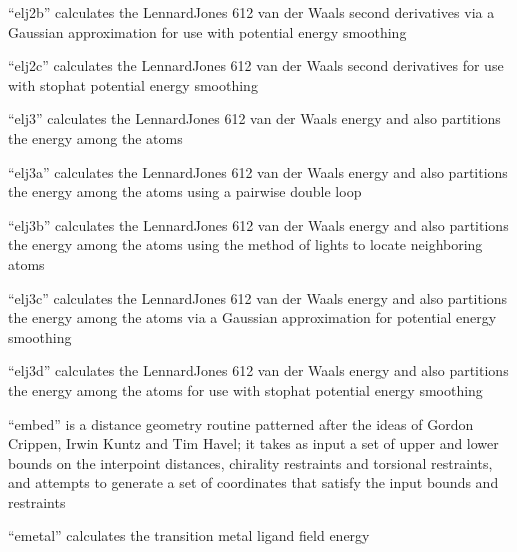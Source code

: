 \documentclass[letterpaper,11pt,english]{sphinxmanual}
\begin{document}

“elj2b” calculates the Lennard\sphinxhyphen{}Jones 6\sphinxhyphen{}12 van der Waals second derivatives via a Gaussian approximation for use with potential energy smoothing


“elj2c” calculates the Lennard\sphinxhyphen{}Jones 6\sphinxhyphen{}12 van der Waals second derivatives for use with stophat potential energy smoothing


“elj3” calculates the Lennard\sphinxhyphen{}Jones 6\sphinxhyphen{}12 van der Waals energy and also partitions the energy among the atoms


“elj3a” calculates the Lennard\sphinxhyphen{}Jones 6\sphinxhyphen{}12 van der Waals energy and also partitions the energy among the atoms using a pairwise double loop


“elj3b” calculates the Lennard\sphinxhyphen{}Jones 6\sphinxhyphen{}12 van der Waals energy and also partitions the energy among the atoms using the method of lights to locate neighboring atoms


“elj3c” calculates the Lennard\sphinxhyphen{}Jones 6\sphinxhyphen{}12 van der Waals energy and also partitions the energy among the atoms via a Gaussian approximation for potential energy smoothing


“elj3d” calculates the Lennard\sphinxhyphen{}Jones 6\sphinxhyphen{}12 van der Waals energy and also partitions the energy among the atoms for use with stophat potential energy smoothing


“embed” is a distance geometry routine patterned after the ideas of Gordon Crippen, Irwin Kuntz and Tim Havel; it takes as input a set of upper and lower bounds on the interpoint distances, chirality restraints and torsional restraints, and attempts to generate a set of coordinates that satisfy the input bounds and restraints


“emetal” calculates the transition metal ligand field energy
\end{document}
